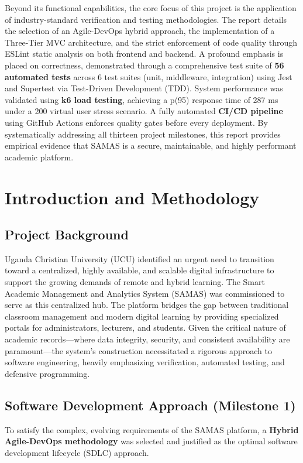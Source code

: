 \documentclass[12pt, a4paper]{report}
\begin{document}
Beyond its functional capabilities, the core focus of this project is the application of industry-standard verification and testing methodologies. The report details the selection of an Agile-DevOps hybrid approach, the implementation of a Three-Tier MVC architecture, and the strict enforcement of code quality through ESLint static analysis on both frontend and backend. A profound emphasis is placed on correctness, demonstrated through a comprehensive test suite of \textbf{56 automated tests} across 6 test suites (unit, middleware, integration) using Jest and Supertest via Test-Driven Development (TDD). System performance was validated using \textbf{k6 load testing}, achieving a p(95) response time of 287 ms under a 200 virtual user stress scenario. A fully automated \textbf{CI/CD pipeline} using GitHub Actions enforces quality gates before every deployment. By systematically addressing all thirteen project milestones, this report provides empirical evidence that SAMAS is a secure, maintainable, and highly performant academic platform.

\newpage
\tableofcontents
\newpage

\chapter{Introduction and Methodology}

\section{Project Background}
Uganda Christian University (UCU) identified an urgent need to transition toward a centralized, highly available, and scalable digital infrastructure to support the growing demands of remote and hybrid learning. The Smart Academic Management and Analytics System (SAMAS) was commissioned to serve as this centralized hub. The platform bridges the gap between traditional classroom management and modern digital learning by providing specialized portals for administrators, lecturers, and students. Given the critical nature of academic records---where data integrity, security, and consistent availability are paramount---the system's construction necessitated a rigorous approach to software engineering, heavily emphasizing verification, automated testing, and defensive programming.

\section{Software Development Approach (Milestone 1)}
To satisfy the complex, evolving requirements of the SAMAS platform, a \textbf{Hybrid Agile-DevOps methodology} was selected and justified as the optimal software development lifecycle (SDLC) approach.
\end{document}
